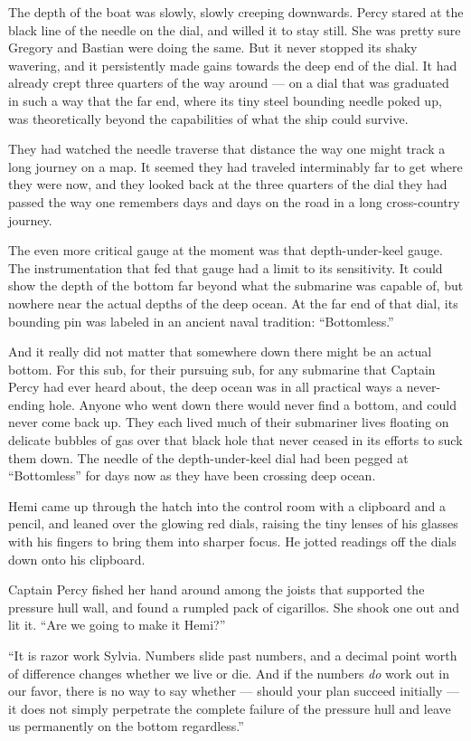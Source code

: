 \documentclass[
]{scrbook}
\begin{document}
The depth of the boat was slowly, slowly creeping downwards. Percy
stared at the black line of the needle on the dial, and willed it to
stay still. She was pretty sure Gregory and Bastian were doing the same.
But it never stopped its shaky wavering, and it persistently made gains
towards the deep end of the dial. It had already crept three quarters of
the way around --- on a dial that was graduated in such a way that the
far end, where its tiny steel bounding needle poked up, was
theoretically beyond the capabilities of what the ship could survive.

They had watched the needle traverse that distance the way one might
track a long journey on a map. It seemed they had traveled interminably
far to get where they were now, and they looked back at the three
quarters of the dial they had passed the way one remembers days and days
on the road in a long cross-country journey.

The even more critical gauge at the moment was that depth-under-keel
gauge. The instrumentation that fed that gauge had a limit to its
sensitivity. It could show the depth of the bottom far beyond what the
submarine was capable of, but nowhere near the actual depths of the deep
ocean. At the far end of that dial, its bounding pin was labeled in an
ancient naval tradition: ``Bottomless.''

And it really did not matter that somewhere down there might be an
actual bottom. For this sub, for their pursuing sub, for any submarine
that Captain Percy had ever heard about, the deep ocean was in all
practical ways a never-ending hole. Anyone who went down there would
never find a bottom, and could never come back up. They each lived much
of their submariner lives floating on delicate bubbles of gas over that
black hole that never ceased in its efforts to suck them down. The
needle of the depth-under-keel dial had been pegged at ``Bottomless''
for days now as they have been crossing deep ocean.

Hemi came up through the hatch into the control room with a clipboard
and a pencil, and leaned over the glowing red dials, raising the tiny
lenses of his glasses with his fingers to bring them into sharper focus.
He jotted readings off the dials down onto his clipboard.

Captain Percy fished her hand around among the joists that supported the
pressure hull wall, and found a rumpled pack of cigarillos. She shook
one out and lit it. ``Are we going to make it Hemi?''

``It is razor work Sylvia. Numbers slide past numbers, and a decimal
point worth of difference changes whether we live or die. And if the
numbers \emph{do} work out in our favor, there is no way to say whether
--- should your plan succeed initially --- it does not simply perpetrate
the complete failure of the pressure hull and leave us permanently on
the bottom regardless.''
\end{document}
